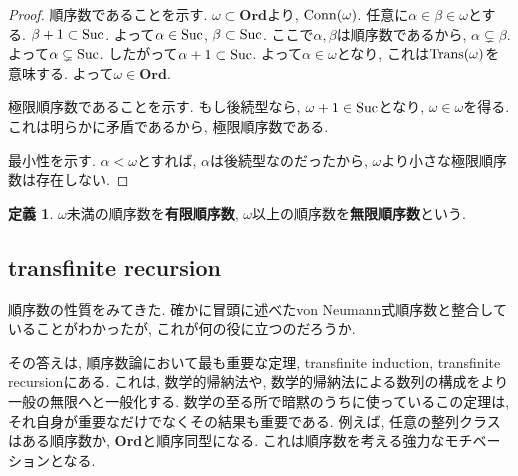 \documentclass[a4paper, twoside]{bxjsarticle}
\theoremstyle{definition}
\newtheorem{defn}[thm]{定義}
\begin{document}
        \begin{proof}
            順序数であることを示す. $\omega \subset \textbf{Ord}$より, ${\rm Conn}(\omega)$. 任意に$\alpha\in\beta\in\omega$とする. $\beta+1\subset{\rm Suc}$. よって$\alpha\in{\rm Suc}$, $\beta\subset{\rm Suc}$. ここで$\alpha, \beta$は順序数であるから, $\alpha\subsetneq\beta$.  よって$\alpha\subsetneq{\rm Suc}$. したがって$\alpha+1\subset {\rm Suc}$. よって$\alpha\in\omega$となり, これは${\rm Trans}(\omega)$を意味する. よって$\omega\in\textbf{Ord}$.
            
            極限順序数であることを示す. もし後続型なら, $\omega+1\in {\rm Suc}$となり, $\omega\in\omega$を得る. これは明らかに矛盾であるから, 極限順序数である.
            
            最小性を示す. $\alpha < \omega$とすれば, $\alpha$は後続型なのだったから, $\omega$より小さな極限順序数は存在しない.
        \end{proof}
        \begin{defn}
            $\omega$未満の順序数を\textbf{有限順序数}, $\omega$以上の順序数を\textbf{無限順序数}という.
        \end{defn}
        
    \subsection{transfinite recursion}
    順序数の性質をみてきた. 確かに冒頭に述べたvon Neumann式順序数と整合していることがわかったが, これが何の役に立つのだろうか.
    
    その答えは, 順序数論において最も重要な定理, transfinite induction, transfinite recursionにある. これは, 数学的帰納法や, 数学的帰納法による数列の構成をより一般の無限へと一般化する. 数学の至る所で暗黙のうちに使っているこの定理は, それ自身が重要なだけでなくその結果も重要である. 例えば, 任意の整列クラスはある順序数か, \textbf{Ord}と順序同型になる. これは順序数を考える強力なモチベーションとなる. 
    
\end{document}
